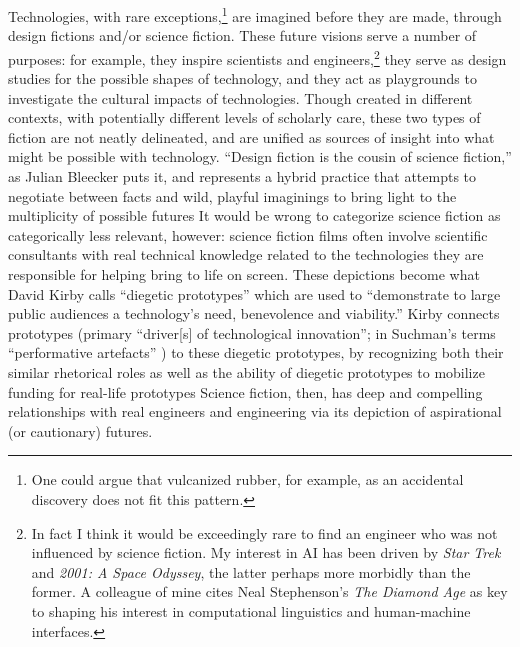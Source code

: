 Technologies, with rare exceptions,\footnote{One could argue that
  vulcanized rubber, for example, as an accidental discovery does not
  fit this pattern.} are imagined before they are made, through design
fictions and/or science fiction. These future
visions serve a number of purposes: for example, they inspire scientists and
engineers,\footnote{In fact I think it would be exceedingly rare to
  find an engineer who was not influenced by science fiction. My
  interest in AI has been driven by \emph{Star Trek} and \emph{2001: A
  Space Odyssey}, the latter perhaps more morbidly than the former. A
  colleague of mine cites Neal Stephenson's
  \emph{The Diamond Age} as key to shaping his interest in
  computational linguistics and human-machine interfaces.} they serve as design
studies for the possible shapes of technology, and they act as
playgrounds to investigate the cultural impacts of technologies.
Though created in different contexts, with potentially 
different levels of scholarly care, these two types of fiction are not
neatly delineated, and are unified as sources of insight into what
might be possible with technology. ``Design fiction is the cousin of
science fiction,'' as Julian Bleecker puts it, and represents a hybrid
practice that attempts to negotiate between facts and wild, playful
imaginings to bring light to the multiplicity of possible
futures\cite[p. 8]{bleecker} It would be wrong to categorize science
fiction as categorically less relevant, however: science fiction
films
often involve scientific consultants with real
technical knowledge related to the technologies they are responsible for
helping bring to life on screen. These depictions become what David
Kirby calls ``diegetic prototypes'' which are used to ``demonstrate to
large public audiences a technology's need, benevolence and
viability.''\cite[p. 43]{kirbyFuture} Kirby connects prototypes (primary
``driver[s] of technological innovation''; in
Suchman's terms ``performative artefacts'' \cite[p. 45]{kirbyFuture})
to these diegetic prototypes, 
by recognizing both their similar rhetorical roles as well as the
ability of diegetic prototypes to mobilize funding for real-life
prototypes \cite[p. 44-47]{kirbyFuture} Science fiction, then, has deep
and compelling relationships with real engineers and engineering via
its depiction of aspirational (or cautionary) futures.


